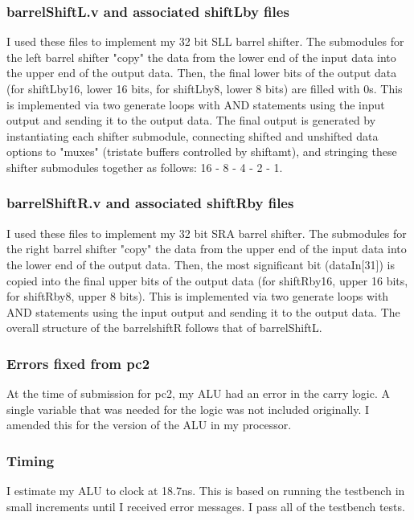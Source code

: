 \documentclass[letterpaper]{article} %
\begin{document}
\subsubsection{barrelShiftL.v and associated shiftLby files}
I used these files to implement my 32 bit SLL barrel shifter. The submodules for the left barrel shifter "copy" the data from the lower end of the input data into the upper end of the output data. Then, the final lower bits of the output data (for shiftLby16, lower 16 bits, for shiftLby8, lower 8 bits) are filled with 0s. This is implemented via two generate loops with AND statements using the input output and sending it to the output data. The final output is generated by instantiating each shifter submodule, connecting shifted and unshifted data options to "muxes" (tristate buffers controlled by shiftamt), and stringing these shifter submodules together as follows: 16 - 8 - 4 - 2 - 1.

\subsubsection{barrelShiftR.v and associated shiftRby files}
I used these files to implement my 32 bit SRA barrel shifter. The submodules for the right barrel shifter "copy" the data from the upper end of the input data into the lower end of the output data. Then, the most significant bit (dataIn[31]) is copied into the final upper bits of the output data (for shiftRby16, upper 16 bits, for shiftRby8, upper 8 bits). This is implemented via two generate loops with AND statements using the input output and sending it to the output data. The overall structure of the barrelshiftR follows that of barrelShiftL.

\subsubsection{Errors fixed from pc2}
At the time of submission for pc2, my ALU had an error in the carry logic. A single variable that was needed for the logic was not included originally. I amended this for the version of the ALU in my processor.

\subsubsection{Timing}
I estimate my ALU to clock at 18.7ns. This is based on running the testbench in small increments until I received error messages. I pass all of the testbench tests.
\end{document}
